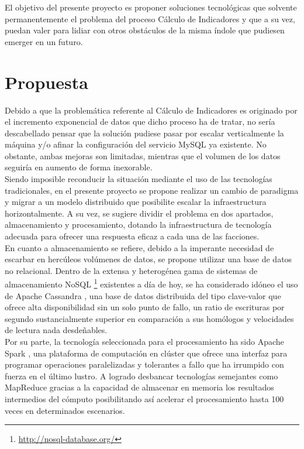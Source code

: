 El objetivo del presente proyecto es proponer soluciones tecnológicas que solvente permanentemente el problema del proceso Cálculo de Indicadores y que a su vez, puedan valer para lidiar con otros obstáculos de la misma índole que pudiesen emerger en un futuro.

\section{Propuesta}

Debido a que la problemática referente al Cálculo de Indicadores es originado por el incremento exponencial de datos que dicho proceso ha de tratar, no sería descabellado pensar que la solución pudiese pasar por escalar verticalmente la máquina y/o afinar la configuración del servicio MySQL ya existente. No obstante, ambas mejoras son limitadas, mientras que el volumen de los datos seguiría en aumento de forma inexorable.\\

Siendo imposible reconducir la situación mediante el uso de las tecnologías tradicionales, en el presente proyecto se propone realizar un cambio de paradigma y migrar a un modelo distribuido que posibilite escalar la infraestructura horizontalmente. A su vez, se sugiere dividir el problema en dos apartados, almacenamiento y procesamiento, dotando la infraestructura de tecnología adecuada para ofrecer una respuesta eficaz a cada una de las facciones.\\

En cuanto a almacenamiento se refiere, debido a la imperante necesidad de escarbar en hercúleos volúmenes de datos, se propone utilizar una base de datos no relacional. Dentro de la extensa y heterogénea gama de sistemas de almacenamiento NoSQL \footnote{\url{http://nosql-database.org/}} existentes a día de hoy, se ha considerado idóneo el uso de Apache Cassandra \cite{lakshman2010cassandra}, una base de datos distribuida del tipo clave-valor que ofrece alta disponibilidad sin un solo punto de fallo, un ratio de escrituras por segundo sustancialmente superior en comparación a sus homólogos \cite{rabl2012solving} y velocidades de lectura nada desdeñables.\\

Por su parte, la tecnología seleccionada para el procesamiento ha sido Apache Spark \cite{zaharia2010spark}, una plataforma de computación en clúster que ofrece una interfaz para programar operaciones paralelizadas y tolerantes a fallo que ha irrumpido con fuerza en el último lustro. A logrado desbancar tecnologías semejantes como MapReduce \cite{dean2008mapreduce} gracias a la capacidad de almacenar en memoria los resultados intermedios del cómputo posibilitando así acelerar el procesamiento hasta 100 veces \cite{xin2013shark} en determinados escenarios.\\

